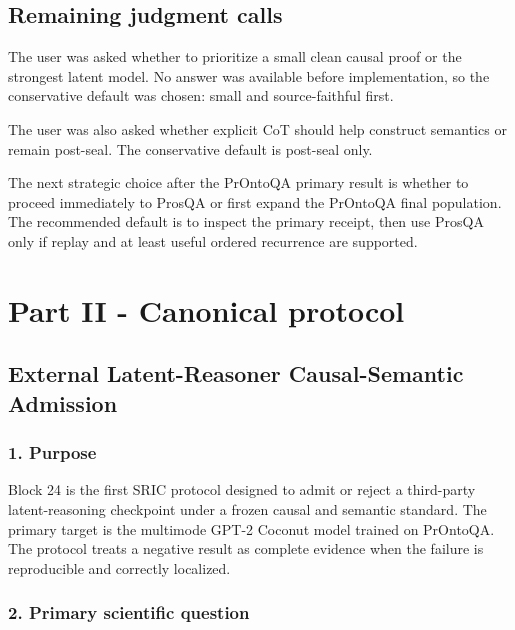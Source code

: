 \documentclass[
  10pt,
]{article}
\begin{document}
\subsection{Remaining judgment calls}\label{remaining-judgment-calls}

The user was asked whether to prioritize a small clean causal proof or
the strongest latent model. No answer was available before
implementation, so the conservative default was chosen: small and
source-faithful first.

The user was also asked whether explicit CoT should help construct
semantics or remain post-seal. The conservative default is post-seal
only.

The next strategic choice after the PrOntoQA primary result is whether
to proceed immediately to ProsQA or first expand the PrOntoQA final
population. The recommended default is to inspect the primary receipt,
then use ProsQA only if replay and at least useful ordered recurrence
are supported.

\newpage

\section{Part II - Canonical
protocol}\label{part-ii---canonical-protocol}

\subsection{External Latent-Reasoner Causal-Semantic
Admission}\label{external-latent-reasoner-causal-semantic-admission}

\subsubsection{1. Purpose}\label{purpose}

Block 24 is the first SRIC protocol designed to admit or reject a
third-party latent-reasoning checkpoint under a frozen causal and
semantic standard. The primary target is the multimode GPT-2 Coconut
model trained on PrOntoQA. The protocol treats a negative result as
complete evidence when the failure is reproducible and correctly
localized.

\subsubsection{2. Primary scientific
question}\label{primary-scientific-question}
\end{document}
